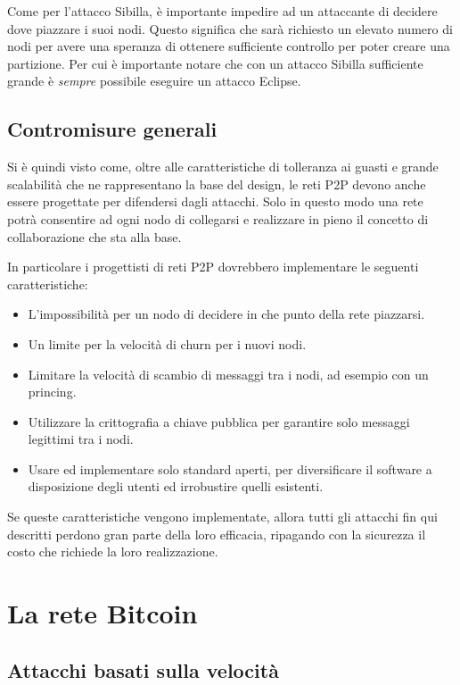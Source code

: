 Come per l'attacco Sibilla, è importante impedire ad un attaccante di decidere dove piazzare i suoi nodi. Questo significa che sarà richiesto un elevato numero di nodi per avere una speranza di ottenere sufficiente controllo per poter creare una partizione. Per cui è importante notare che con un attacco Sibilla sufficiente grande è \emph{sempre} possibile eseguire un attacco Eclipse.

\subsection{Contromisure generali}\label{contromisure-generali}

Si è quindi visto come, oltre alle caratteristiche di tolleranza ai guasti e grande scalabilità che ne rappresentano la base del design, le reti P2P devono anche essere progettate per difendersi dagli attacchi. Solo in questo modo una rete potrà consentire ad ogni nodo di collegarsi e realizzare in pieno il concetto di collaborazione che sta alla base.

In particolare i progettisti di reti P2P dovrebbero implementare le seguenti caratteristiche:

\begin{itemize}
\itemsep1pt\parskip0pt
\item
  L'impossibilità per un nodo di decidere in che punto della rete   piazzarsi.
\item
  Un limite per la velocità di churn per i nuovi nodi.
\item
  Limitare la velocità di scambio di messaggi tra i nodi, ad esempio   con un princing.
\item
  Utilizzare la crittografia a chiave pubblica per garantire solo   messaggi legittimi tra i nodi.
\item
  Usare ed implementare solo standard aperti, per diversificare il   software a disposizione degli utenti ed irrobustire quelli esistenti.
\end{itemize}

Se queste caratteristiche vengono implementate, allora tutti gli attacchi fin qui descritti perdono gran parte della loro efficacia, ripagando con la sicurezza il costo che richiede la loro realizzazione.

\section{La rete Bitcoin}\label{la-rete-bitcoin}

\subsection{Attacchi basati sulla velocità}\label{double-spending}

